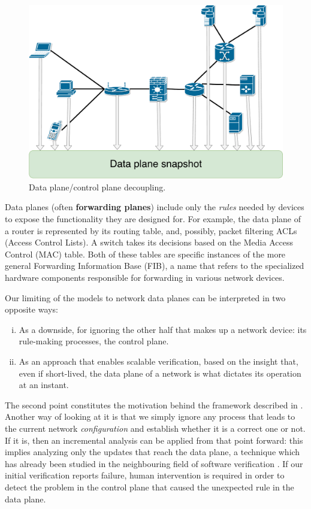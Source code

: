 \begin{figure}[h]
  \centering
  \includegraphics[scale=0.3]{src/img/data-plane-snapshot}
  \caption{Data plane/control plane decoupling.}
  \label{fig:data-plane-snapshot}
\end{figure}

Data planes (often \textbf{forwarding planes}) include only the \emph{rules}
needed by devices to expose the functionality they are designed for.  For
example, the data plane of a router is represented by its routing table, and,
possibly, packet filtering ACLs (Access Control Lists).  A switch takes its decisions based on the Media Access Control
(MAC) table. Both of these tables are
specific instances of the more general Forwarding Information Base
(FIB), a name that refers to the
specialized hardware components responsible for forwarding in various network
devices.

Our limiting of the models to network data planes can be interpreted in two
opposite ways:
\begin{enumerate}[(i)]
  \item As a downside, for ignoring the other half that makes up a network
    device: its rule-making processes, the control plane.
  \item As an approach that enables scalable verification, based on the insight
    that, even if short-lived, the data plane of a network is what dictates its
    operation at an instant.
\end{enumerate}

The second point constitutes the motivation behind the framework described in
.  Another way of looking at it is that
we simply ignore any process that leads to the current network
\emph{configuration} and establish whether it is a correct one or not.  If it
is, then an incremental analysis can be applied from that point forward: this
implies analyzing only the updates that reach the data plane, a technique which
has already been studied in the neighbouring field of software verification
\cite{marinescu2013katch}.  If our initial verification reports failure, human
intervention is required in order to detect the problem in the control plane
that caused the unexpected rule in the data plane.



